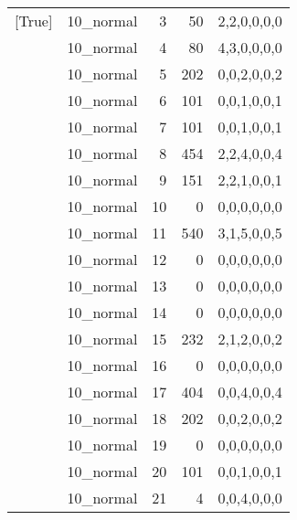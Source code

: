 \begin{tabular}{llrrl}
 [True]          & 10\_normal           &             3 &                    50 & 2,2,0,0,0,0   \\
 [True]          & 10\_normal           &             4 &                    80 & 4,3,0,0,0,0   \\
 [True]          & 10\_normal           &             5 &                   202 & 0,0,2,0,0,2   \\
 [True]          & 10\_normal           &             6 &                   101 & 0,0,1,0,0,1   \\
 [True]          & 10\_normal           &             7 &                   101 & 0,0,1,0,0,1   \\
 [True]          & 10\_normal           &             8 &                   454 & 2,2,4,0,0,4   \\
 [True]          & 10\_normal           &             9 &                   151 & 2,2,1,0,0,1   \\
 [True]          & 10\_normal           &            10 &                     0 & 0,0,0,0,0,0   \\
 [True]          & 10\_normal           &            11 &                   540 & 3,1,5,0,0,5   \\
 [True]          & 10\_normal           &            12 &                     0 & 0,0,0,0,0,0   \\
 [True]          & 10\_normal           &            13 &                     0 & 0,0,0,0,0,0   \\
 [True]          & 10\_normal           &            14 &                     0 & 0,0,0,0,0,0   \\
 [True]          & 10\_normal           &            15 &                   232 & 2,1,2,0,0,2   \\
 [True]          & 10\_normal           &            16 &                     0 & 0,0,0,0,0,0   \\
 [True]          & 10\_normal           &            17 &                   404 & 0,0,4,0,0,4   \\
 [True]          & 10\_normal           &            18 &                   202 & 0,0,2,0,0,2   \\
 [True]          & 10\_normal           &            19 &                     0 & 0,0,0,0,0,0   \\
 [True]          & 10\_normal           &            20 &                   101 & 0,0,1,0,0,1   \\
 [True]          & 10\_normal           &            21 &                     4 & 0,0,4,0,0,0   \\

\end{tabular}
